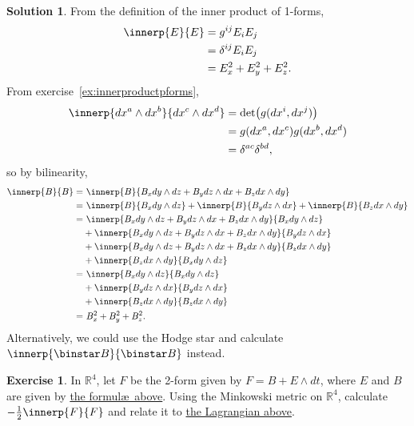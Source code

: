 \documentclass[11pt, a4paper]{report}
\theoremstyle{definition}
\newtheorem{exercise}{Exercise}[part]
\newtheorem{solution}{Solution}[part]
\newenvironment{ex}{\begin{exercise}}{\end{exercise}\pagebreak[1]}
\newenvironment{sol}{\begin{solution}}{\end{solution}\pagebreak[3]}
\renewcommand*{\star}{\ensuremath\mathop{}\mathopen\binstar\mathord{}}
\begin{document}
\begin{sol}

From the definition of the inner product of 1-forms,
\begin{align*}
    \innerp{E}{E} &= g^{ij} E_i E_j \\
                  &= \delta^{ij} E_i E_j \\
                  &= E_x^2 + E_y^2 + E_z^2.
\end{align*}
From exercise~\ref{ex:innerproductpforms},
\begin{align*}
    \innerp{dx^a \wedge dx^b}{dx^c \wedge dx^d} &= \det \bigl(g(dx^i, dx^j)\bigr) \\
        &= g(dx^a, dx^c) g(dx^b, dx^d) \\
        &= \delta^{ac} \delta^{bd},
\end{align*}
so by bilinearity,
\begin{align*}
    \innerp{B}{B} =&\ \innerp{B}{B_x dy \wedge dz + B_y dz \wedge dx + B_z dx \wedge dy} \\
        =&\ \innerp{B}{B_x dy \wedge dz}
            + \innerp{B}{B_y dz \wedge dx}
            + \innerp{B}{B_z dx \wedge dy} \\
        =&\ \innerp{B_x dy \wedge dz + B_y dz \wedge dx + B_z dx \wedge dy}
                   {B_x dy \wedge dz} \\
        &+ \innerp{B_x dy \wedge dz + B_y dz \wedge dx + B_z dx \wedge dy}
                  {B_y dz \wedge dx} \\
        &+ \innerp{B_x dy \wedge dz + B_y dz \wedge dx + B_z dx \wedge dy}
                  {B_z dx \wedge dy} \\
        &+ \innerp{B_z dx \wedge dy}{B_x dy \wedge dz} \\
        =&\ \innerp{B_x dy \wedge dz}{B_x dy \wedge dz} \\
        &+ \innerp{B_y dz \wedge dx}{B_y dz \wedge dx} \\
        &+ \innerp{B_z dx \wedge dy}{B_z dx \wedge dy} \\
        =&\ B_x^2 + B_y^2 + B_z^2.
\end{align*}
Alternatively, we could use the Hodge star and calculate $\innerp{\star B}{\star B}$ instead.

\end{sol}

\begin{ex}

In $\mathbb{R}^4$, let $F$ be the 2-form given by $F = B + E \wedge dt$, where $E$ and $B$ are given by \hyperref[ex:esquaredbsquared]{the formul\ae\ above}. Using the Minkowski metric on $\mathbb{R}^4$, calculate $-\frac{1}{2} \innerp{F}{F}$ and relate it to \hyperlink{eq:emlagrangianvacuum}{the Lagrangian above}.

\end{ex}
\end{document}
